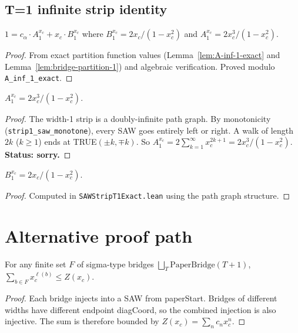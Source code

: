 \begin{lemma}
\begin{enumerate}
\subsection{T=1 infinite strip identity}

\begin{theorem}[$T=1$ infinite strip identity]\label{thm:inf-strip-T1}
  $1 = c_\alpha \cdot A^{x_c}_1 + x_c \cdot B^{x_c}_1$ where
  $B^{x_c}_1 = 2x_c/(1-x_c^2)$ and $A^{x_c}_1 = 2x_c^3/(1-x_c^2)$.
\end{theorem}
\begin{proof}
  From exact partition function values (Lemma~\ref{lem:A-inf-1-exact} and
  Lemma~\ref{lem:bridge-partition-1}) and algebraic verification.
  Proved modulo \texttt{A\_inf\_1\_exact}.
\end{proof}

\begin{lemma}[Exact $A^{x_c}_1$]\label{lem:A-inf-1-exact}
  $A^{x_c}_1 = 2x_c^3/(1-x_c^2)$.
\end{lemma}
\begin{proof}
  The width-1 strip is a doubly-infinite path graph. By monotonicity
  (\texttt{strip1\_saw\_monotone}), every SAW goes entirely left or right.
  A walk of length $2k$ ($k \geq 1$) ends at TRUE$(\pm k, \mp k)$.
  So $A^{x_c}_1 = 2 \sum_{k=1}^\infty x_c^{2k+1} = 2x_c^3/(1-x_c^2)$.
  \textbf{Status: sorry.}
\end{proof}

\begin{lemma}[Exact bridge partition for $T=1$]\label{lem:bridge-partition-1}
\leanok
  $B^{x_c}_1 = 2x_c/(1-x_c^2)$.
\end{lemma}
\begin{proof}\leanok
  Computed in \texttt{SAWStripT1Exact.lean} using the path graph structure.
\end{proof}


\section{Alternative proof path}\label{sec:alt-proof}

\begin{lemma}\label{lem:bridge-sigma-sum}
\leanok
  For any finite set $F$ of sigma-type bridges $\bigsqcup_T \mathrm{PaperBridge}(T{+}1)$,
  $\sum_{b \in F} x_c^{\ell(b)} \leq Z(x_c)$.
\end{lemma}
\begin{proof}\leanok
  Each bridge injects into a SAW from paperStart. Bridges of different widths
  have different endpoint diagCoord, so the combined injection is also injective.
  The sum is therefore bounded by $Z(x_c) = \sum_n c_n x_c^n$.
\end{proof}


\end{enumerate}
\end{lemma}
